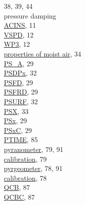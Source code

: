 \documentclass[
  english,
]{book}
\begin{document}
38, 39, 44\\
pressure damping\\
\hspace*{0.333em}\hspace*{0.333em}\href{./3-the-state-of-the-aircraft.html\#acins}{ACINS},
11\\
\hspace*{0.333em}\hspace*{0.333em}\href{./3-the-state-of-the-aircraft.html\#vspd}{VSPD},
12\\
\hspace*{0.333em}\hspace*{0.333em}\href{./3-the-state-of-the-aircraft.html\#wp3}{WP3},
12\\
\href{./4-the-state-of-the-atmosphere.html\#moist-air}{properties of
moist air}, 34\\
\href{./4-the-state-of-the-atmosphere.html\#psx}{PS\_A}, 29\\
\href{./4-the-state-of-the-atmosphere.html\#p-special}{PSDPx}, 32\\
\href{./4-the-state-of-the-atmosphere.html\#psx}{PSFD}, 29\\
\href{./4-the-state-of-the-atmosphere.html\#psx}{PSFRD}, 29\\
\href{./4-the-state-of-the-atmosphere.html\#p-special}{PSURF}, 32\\
\href{./4-the-state-of-the-atmosphere.html\#psx}{PSX}, 33\\
\href{./4-the-state-of-the-atmosphere.html\#psx}{PSx}, 29\\
\href{./4-the-state-of-the-atmosphere.html\#psx}{PSxC}, 29\\
\href{./10-obsolete-variables.html\#ptime\%7C}{PTIME}, 85\\
\href{./8-radiation-variables.html\#visxv}{pyranometer}, 79, 91\\
\hspace*{0.333em}\hspace*{0.333em}\href{./8-radiation-variables.html\#visxv}{calibration},
79\\
\href{./8-radiation-variables.html\#irxv}{pyrgeometer}, 78, 91\\
\hspace*{0.333em}\hspace*{0.333em}\href{./8-radiation-variables.html\#irxv}{calibration},
78\\
\href{./10-obsolete-variables.html\#qcb}{QCB}, 87\\
\href{./10-obsolete-variables.html\#qcb}{QCBC}, 87\\
\end{document}
